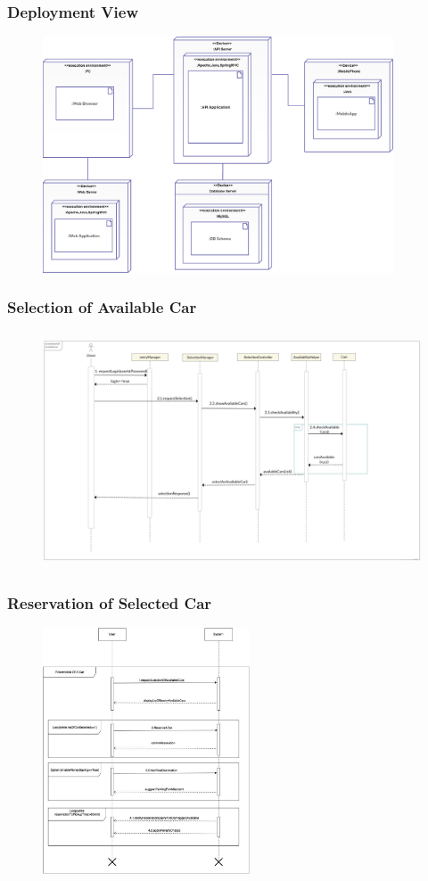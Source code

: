 \begin{frame}
	\frametitle{Deployment View}
	\begin{figure}[H]
		\centering
		\includegraphics[height=7cm,keepaspectratio]{figures/deployment_view.eps}
		\label{fig:deployment_view}
	\end{figure}
\end{frame}

\begin{frame}
	\frametitle{Selection of Available Car}
	\begin{figure}[H]
		\centering
		\includegraphics[height=7cm,keepaspectratio]{figures/selection_available_car.eps}
		\label{fig:selection_available_car}
	\end{figure}
\end{frame}

\begin{frame}
	\frametitle{Reservation of Selected Car}
	\begin{figure}[H]
		\centering
		\includegraphics[height=7.3cm,keepaspectratio]{figures/sequence_reservation.eps}
		\label{fig:sequence_reservation}
	\end{figure}
\end{frame}

